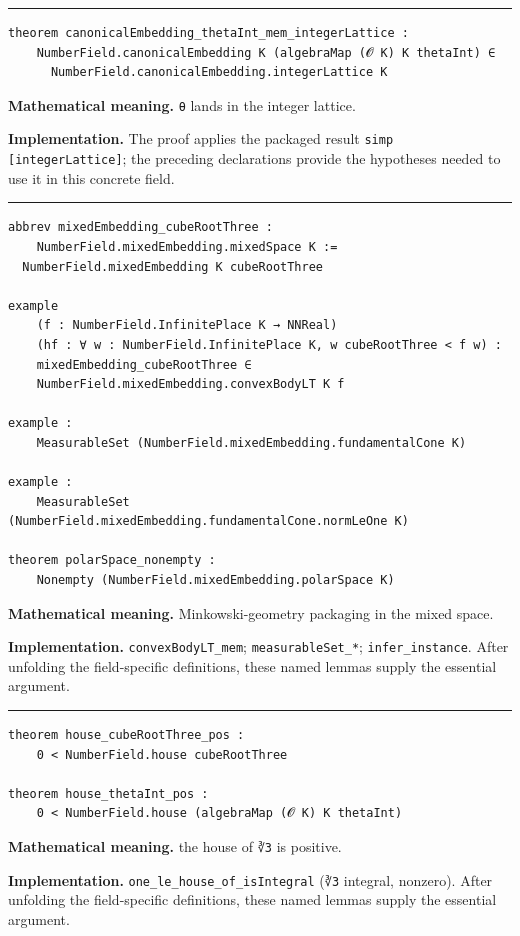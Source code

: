 \documentclass[UTF8,a4paper,11pt,fontset=fandol]{ctexart}
\theoremstyle{definition}
\newcommand{\statementsep}{\par\medskip\hrule\medskip}
\begin{document}
\statementsep
\begin{verbatim}
theorem canonicalEmbedding_thetaInt_mem_integerLattice :
    NumberField.canonicalEmbedding K (algebraMap (𝓞 K) K thetaInt) ∈
      NumberField.canonicalEmbedding.integerLattice K
\end{verbatim}
\noindent\textbf{Mathematical meaning.} \texttt{θ} lands in the integer lattice.\par
\noindent\textbf{Implementation.} The proof applies the packaged result \texttt{simp [integerLattice]}; the preceding declarations provide the hypotheses needed to use it in this concrete field.\par
\statementsep
\begin{verbatim}
abbrev mixedEmbedding_cubeRootThree :
    NumberField.mixedEmbedding.mixedSpace K :=
  NumberField.mixedEmbedding K cubeRootThree

example
    (f : NumberField.InfinitePlace K → NNReal)
    (hf : ∀ w : NumberField.InfinitePlace K, w cubeRootThree < f w) :
    mixedEmbedding_cubeRootThree ∈
    NumberField.mixedEmbedding.convexBodyLT K f

example :
    MeasurableSet (NumberField.mixedEmbedding.fundamentalCone K)

example :
    MeasurableSet (NumberField.mixedEmbedding.fundamentalCone.normLeOne K)

theorem polarSpace_nonempty :
    Nonempty (NumberField.mixedEmbedding.polarSpace K)
\end{verbatim}
\noindent\textbf{Mathematical meaning.} Minkowski-geometry packaging in the mixed space.\par
\noindent\textbf{Implementation.} \texttt{convexBodyLT\_\allowbreak{}mem}; \texttt{measurableSet\_\allowbreak{}*}; \texttt{infer\_\allowbreak{}instance}. After unfolding the field-specific definitions, these named lemmas supply the essential argument.\par
\statementsep
\begin{verbatim}
theorem house_cubeRootThree_pos :
    0 < NumberField.house cubeRootThree

theorem house_thetaInt_pos :
    0 < NumberField.house (algebraMap (𝓞 K) K thetaInt)
\end{verbatim}
\noindent\textbf{Mathematical meaning.} the house of \texttt{∛3} is positive.\par
\noindent\textbf{Implementation.} \texttt{one\_\allowbreak{}le\_\allowbreak{}house\_\allowbreak{}of\_\allowbreak{}isIntegral} (\texttt{∛3} integral, nonzero). After unfolding the field-specific definitions, these named lemmas supply the essential argument.\par
\end{document}
